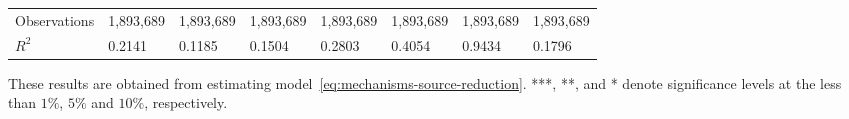 \begin{table}[H]
{\begin{tabular}{@{}llllllll@{}}
            Observations       & 1,893,689   & 1,893,689            & 1,893,689                & 1,893,689           & 1,893,689        & 1,893,689 & 1,893,689 \\
            $R^2$              & 0.2141      & 0.1185               & 0.1504                   & 0.2803              & 0.4054           & 0.9434    & 0.1796    \\ \bottomrule\bottomrule
        \end{tabular}%
    }
    \begin{minipage}{18cm}
        \vspace{0.05in}
        These results are obtained from estimating model~\ref{eq:mechanisms-source-reduction}. ***, **, and * denote significance levels at the less than $1\%$, $5\%$ and $10\%$, respectively.
    \end{minipage}
\end{table}